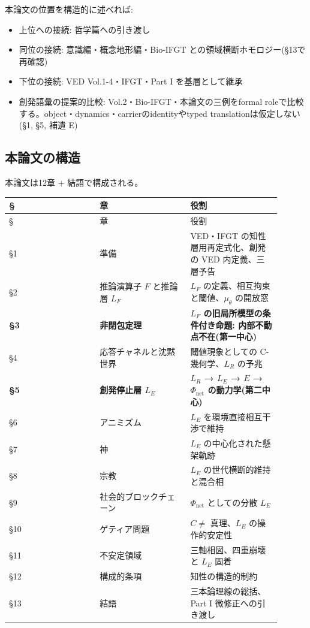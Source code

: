 本論文の位置を構造的に述べれば:

\begin{itemize}
\item 上位への接続: 哲学篇への引き渡し
\item 同位の接続: 意識編・概念地形編・Bio-IFGT との領域横断ホモロジー(\S{}13で再確認)
\item 下位の接続: VED Vol.1-4・IFGT・Part I を基層として継承
\item 創発語彙の提案的比較: Vol.2・Bio-IFGT・本論文の三例をformal roleで比較する。object・dynamics・carrierのidentityやtyped translationは仮定しない(\S{}1, \S{}5, 補遺 E)
\end{itemize}


\bigskip


\subsection{本論文の構造}


本論文は12章 + 結語で構成される。

\begin{longtable}{@{}p{0.30\linewidth}p{0.30\linewidth}p{0.30\linewidth}@{}}
\toprule
\S{} & 章 & 役割 \\
\midrule
\endfirsthead
\toprule
\S{} & 章 & 役割 \\
\midrule
\endhead
\S{}1 & 準備 & VED・IFGT の知性層用再定式化、創発の VED 内定義、三層予告 \\
\S{}2 & 推論演算子 $F$ と推論層 $L_F$ & $L_F$ の定義、相互拘束と閾値、$\mu_\theta$ の開放窓 \\
\textbf{\S{}3} & \textbf{非閉包定理} & \textbf{$L_F$ の旧局所模型の条件付き命題: 内部不動点不在(第一中心)} \\
\S{}4 & 応答チャネルと沈黙世界 & 閾値現象としての C-幾何学、$L_R$ の予兆 \\
\textbf{\S{}5} & \textbf{創発停止層 $L_E$} & \textbf{$L_R$ → $L_E$ → $E$ → $\Phi_{\text{net}}$ の動力学(第二中心)} \\
\S{}6 & アニミズム & $L_E$ を環境直接相互干渉で維持 \\
\S{}7 & 神 & $L_E$ の中心化された懸架軌跡 \\
\S{}8 & 宗教 & $L_E$ の世代横断的維持と混合相 \\
\S{}9 & 社会的ブロックチェーン & $\Phi_{\text{net}}$ としての分散 $L_E$ \\
\S{}10 & ゲティア問題 & $C \neq$ 真理、$L_E$ の操作的安定性 \\
\S{}11 & 不安定領域 & 三軸相図、四重崩壊と $L_E$ 固着 \\
\S{}12 & 構成的条項 & 知性の構造的制約 \\
\S{}13 & 結語 & 三本論理線の総括、Part I 微修正への引き渡し \\
\bottomrule
\end{longtable}



